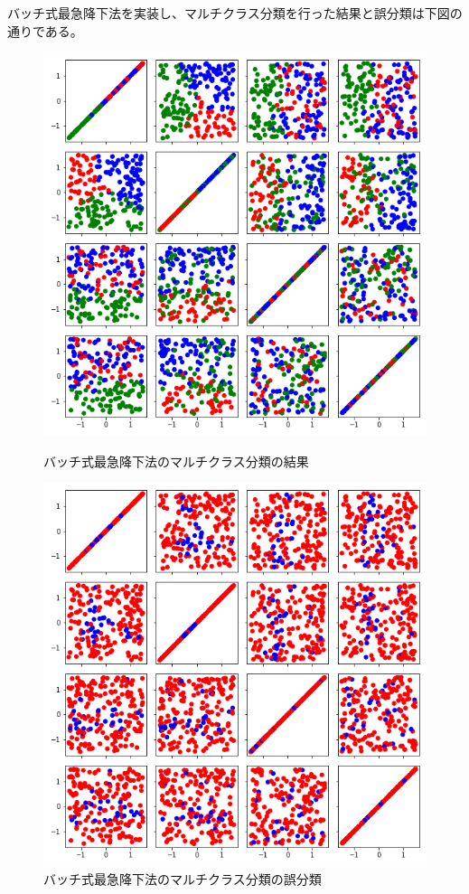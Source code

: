 \documentclass{jsarticle}
\begin{document}
\begin{enumerate}
  バッチ式最急降下法を実装し、マルチクラス分類を行った結果と誤分類は下図の通りである。
  \begin{figure}[htbp]
    \centering
    \begin{minipage}{0.4\linewidth}
      \centering
      \includegraphics[width=.9\textwidth]{image/1-4-1.png}
    \caption{バッチ式最急降下法のマルチクラス分類の結果}
    \end{minipage}
    \begin{minipage}{0.4\linewidth}
      \centering
      \includegraphics[width=.9\textwidth]{image/1-4-2.png}
    \caption{バッチ式最急降下法のマルチクラス分類の誤分類}
    \end{minipage}
  \end{figure}


\end{enumerate}
\end{document}
